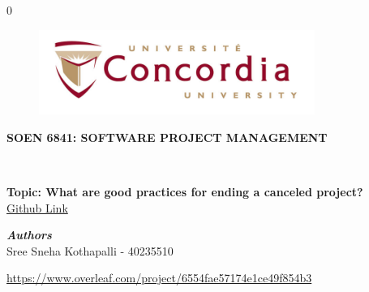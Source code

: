 \documentclass[11pt]{article}
\newcommand{\blind}{0}
\begin{document}
    \def\spacingset#1{\renewcommand{\baselinestretch}%
			{#1}\small\normalsize} \spacingset{1}
		
		\blind
		{
            \begin{titlepage}
            \vspace*{0.7in}
            \begin{center}
            \begin{figure}[htb]
            \begin{center}
            \includegraphics[width=9cm]{concordia-logo (1).jpg}
            \end{center}
            \end{figure}
            \vspace*{0.3in}
            \begin{Large}
            \textbf{SOEN 6841: SOFTWARE PROJECT MANAGEMENT} \\
            \end{Large}
            \vspace*{0.2in}
            \begin{Large}
            \end{Large}
            \\
            \vspace*{0.9in}
            \begin{Large}
            \textbf{Topic: What are good practices for ending
a canceled project?} \\
            \vspace*{0.2in}
            \href{https://github.com/SnehaKothapalli/SOEN-6841}{Github Link}\\
            \end{Large}
            \vspace*{0.75in}
            \begin{Large}
            \textbf{\emph{Authors}} \\
            \vspace*{0.2in}
            Sree Sneha Kothapalli - 40235510\\
            \end{Large}
            \end{center}
            \begin{center}
            \vspace*{0.9in}
            \href{https://www.overleaf.com/project/6554fae57174e1ce49f854b3}{https://www.overleaf.com/project/6554fae57174e1ce49f854b3}\end{center}
            \end{titlepage}
	\spacingset{1.5}

}
\end{document}

